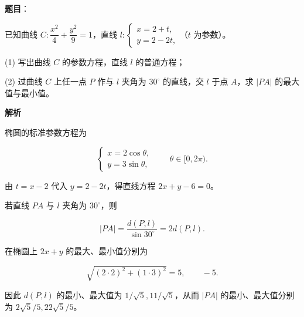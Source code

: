 \begin{answer}

\textbf{题目}：

已知曲线 $C:\dfrac{x^2}{4}+\dfrac{y^2}{9}=1$，直线 $l:\begin{cases}x=2+t,\\y=2-2t,\end{cases}$（$t$ 为参数）。

(1) 写出曲线 $C$ 的参数方程，直线 $l$ 的普通方程；

(2) 过曲线 $C$ 上任一点 $P$ 作与 $l$ 夹角为 $30^\circ$ 的直线，交 $l$ 于点 $A$，求 $|PA|$ 的最大值与最小值。

\textbf{解析}


椭圆的标准参数方程为

\nopagebreak[4]
\[
\begin{cases}
x=2\cos\theta,\\
y=3\sin\theta,
\end{cases}\qquad \theta\in[0,2\pi).
\]

由 $t=x-2$ 代入 $y=2-2t$，得直线方程 $2x+y-6=0$。


若直线 $PA$ 与 $l$ 夹角为 $30^\circ$，则

\nopagebreak[4]
\[
|PA|=\frac{d(P,l)}{\sin30^\circ}=2d(P,l).
\]

在椭圆上 $2x+y$ 的最大、最小值分别为

\nopagebreak[4]
\[
\sqrt{(2\cdot2)^2+(1\cdot3)^2}=5,\qquad-5.
\]

因此 $d(P,l)$ 的最小、最大值为 $1/\sqrt5,11/\sqrt5$，从而 $|PA|$ 的最小、最大值分别为 $2\sqrt5/5,22\sqrt5/5$。

\gkanswer{答案（1）：$\begin{cases}x=2\cos\theta,\\y=3\sin\theta,\end{cases}\ (\theta\in[0,2\pi))$；$2x+y-6=0$。}


\end{answer}
